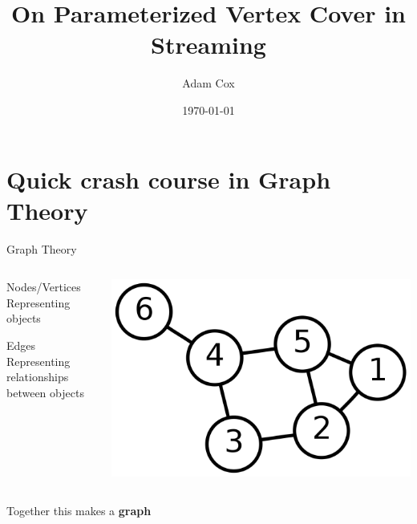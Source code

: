 \documentclass{beamer}
\title{On Parameterized Vertex Cover in Streaming}
\date{\today}
\author{Adam Cox}
\institute{
    School of Computer Science \\
    University of Birmingham
}
\begin{document}
\maketitle

\section{Quick crash course in Graph Theory}

\begin{frame}{Graph Theory}
    \begin{columns}
        \begin{column}{0.55\textwidth}
            \begin{block}{Nodes/Vertices}
                Representing objects
            \end{block}
            \begin{block}{Edges}
                Representing relationships between objects
            \end{block}
        \end{column}
        \begin{column}{0.35\textwidth}
            \begin{center}
                \includegraphics[width=\textwidth]{graph-theory}
            \end{center}
        \end{column}
    \end{columns}

    \begin{center}
        Together this makes a \textbf{graph}
    \end{center}
\end{frame}
\end{document}

